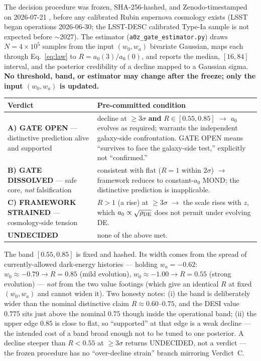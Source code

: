 \documentclass[11pt,a4paper]{article}
\newcommand{\rhoDE}{\rho_{\rm DE}}
\newcommand{\azero}{a_0}
\begin{document}
The decision procedure was frozen, SHA-256-hashed, and Zenodo-timestamped on
2026-07-21 \cite{Zprereg}, before any calibrated Rubin supernova cosmology
exists (LSST began operations 2026-06-30; the LSST-DESC calibrated Type-Ia
sample is not expected before $\sim$2027). The estimator
(\texttt{a0z\_gate\_estimator.py}) draws $N=4\times10^5$ samples from the
input $(w_0,w_a)$ bivariate Gaussian, maps each through Eq.~\eqref{eq:law} to
$R=\azero(3)/\azero(0)$, and reports the median, $[16,84]$ interval, and the
posterior credibility of a decline mapped to a Gaussian sigma. \textbf{No
threshold, band, or estimator may change after the freeze; only the input
$(w_0,w_a)$ is updated.}

\begin{center}
\begin{tabular}{p{4.2cm}p{9.3cm}}
\toprule
Verdict & Pre-committed condition\\
\midrule
\textbf{A) GATE OPEN} --- distinctive prediction alive and supported &
decline at $\ge3\sigma$ \textbf{and} $R\in[0.55,0.85]$ $\to$ $\azero$ evolves
as required; warrants the independent galaxy-side confrontation. GATE OPEN
means ``survives to face the galaxy-side test,'' explicitly not
``confirmed.''\\
\textbf{B) GATE DISSOLVED} --- safe core, \emph{not} falsification &
consistent with flat ($R=1$ within $2\sigma$) $\to$ framework reduces to
constant-$\azero$ MOND; the distinctive prediction is inapplicable.\\
\textbf{C) FRAMEWORK STRAINED} --- cosmology-side tension &
$R>1$ (a rise) at $\ge3\sigma$ $\to$ the scale rises with $z$, which
$\azero\propto\sqrt{\rhoDE}$ does not permit under evolving DE.\\
\textbf{UNDECIDED} & none of the above met.\\
\bottomrule
\end{tabular}
\end{center}

The band $[0.55,0.85]$ is fixed and hashed. Its width comes from the spread of
currently-allowed dark-energy histories --- holding $w_a=-0.62$:
$w_0\approx-0.79\to R=0.85$ (mild evolution), $w_0\approx-1.00\to R=0.55$
(strong evolution) --- \emph{not} from the two value footings (which give an
identical $R$ at fixed $(w_0,w_a)$ and cannot widen it). Two honesty notes:
(i) the band is deliberately wider than the nominal distinctive claim
$R\approx0.60$--$0.75$, and the DESI value $0.775$ sits just above the nominal
$0.75$ though inside the operational band; (ii) the upper edge $0.85$ is close
to flat, so ``supported'' at that edge is a weak decline --- the intended cost
of a band broad enough not to be tuned to one posterior. A decline steeper
than $R<0.55$ at $\ge3\sigma$ returns UNDECIDED, not a verdict --- the frozen
procedure has no ``over-decline strain'' branch mirroring Verdict~C.
\end{document}
